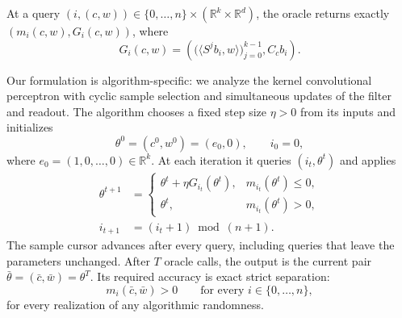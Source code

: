\documentclass[10pt]{article}
\theoremstyle{definition}
\begin{document}
At a query $(i,(c,w))\in\{0,\ldots,n\}\times(\mathbb{R}^k\times\mathbb{R}^d)$, the oracle returns exactly $(m_i(c,w),G_i(c,w))$, where
\[
G_i(c,w)=\left(
\bigl(\langle S^j b_i,w\rangle\bigr)_{j=0}^{k-1},
C_c b_i
\right).
\]

Our formulation is algorithm-specific: we analyze the kernel convolutional perceptron with cyclic sample selection and simultaneous updates of the filter and readout. The algorithm chooses a fixed step size $\eta>0$ from its inputs and initializes
\[
\theta^0=(c^0,w^0)=(e_0,0),\qquad i_0=0,
\]
where $e_0=(1,0,\ldots,0)\in\mathbb{R}^k$. At each iteration it queries $(i_t,\theta^t)$ and applies
\[
\begin{aligned}
\theta^{t+1}
&=\begin{cases}
\theta^t+\eta G_{i_t}(\theta^t),&m_{i_t}(\theta^t)\leq0,\\
\theta^t,&m_{i_t}(\theta^t)>0,
\end{cases}\\
i_{t+1}&=(i_t+1)\bmod(n+1).
\end{aligned}
\]
The sample cursor advances after every query, including queries that leave the parameters unchanged. After $T$ oracle calls, the output is the current pair $\bar\theta=(\bar c,\bar w)=\theta^T$. Its required accuracy is exact strict separation:
\[
m_i(\bar c,\bar w)>0
\qquad\text{for every }i\in\{0,\ldots,n\},
\]
for every realization of any algorithmic randomness.
\end{document}
